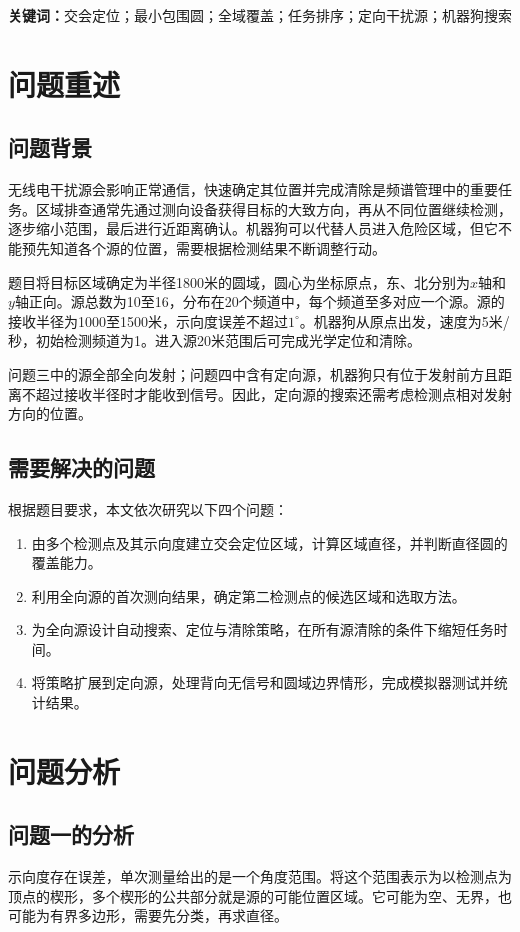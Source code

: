 \documentclass[UTF8,fontset=fandol,a4paper,zihao=-4]{ctexart}
\begin{document}
\noindent\textbf{关键词：}交会定位；最小包围圆；全域覆盖；任务排序；定向干扰源；机器狗搜索
\clearpage

\section{问题重述}
\subsection{问题背景}
无线电干扰源会影响正常通信，快速确定其位置并完成清除是频谱管理中的重要任务。区域排查通常先通过测向设备获得目标的大致方向，再从不同位置继续检测，逐步缩小范围，最后进行近距离确认。机器狗可以代替人员进入危险区域，但它不能预先知道各个源的位置，需要根据检测结果不断调整行动。

题目将目标区域确定为半径1800米的圆域，圆心为坐标原点，东、北分别为$x$轴和$y$轴正向。源总数为10至16，分布在20个频道中，每个频道至多对应一个源。源的接收半径为1000至1500米，示向度误差不超过$1^\circ$。机器狗从原点出发，速度为5米/秒，初始检测频道为1。进入源20米范围后可完成光学定位和清除\cite{problem}。

问题三中的源全部全向发射；问题四中含有定向源，机器狗只有位于发射前方且距离不超过接收半径时才能收到信号。因此，定向源的搜索还需考虑检测点相对发射方向的位置。

\subsection{需要解决的问题}
根据题目要求，本文依次研究以下四个问题：
\begin{enumerate}
\item 由多个检测点及其示向度建立交会定位区域，计算区域直径，并判断直径圆的覆盖能力。
\item 利用全向源的首次测向结果，确定第二检测点的候选区域和选取方法。
\item 为全向源设计自动搜索、定位与清除策略，在所有源清除的条件下缩短任务时间。
\item 将策略扩展到定向源，处理背向无信号和圆域边界情形，完成模拟器测试并统计结果。
\end{enumerate}

\section{问题分析}
\subsection{问题一的分析}
示向度存在误差，单次测量给出的是一个角度范围。将这个范围表示为以检测点为顶点的楔形，多个楔形的公共部分就是源的可能位置区域。它可能为空、无界，也可能为有界多边形，需要先分类，再求直径。
\end{document}
